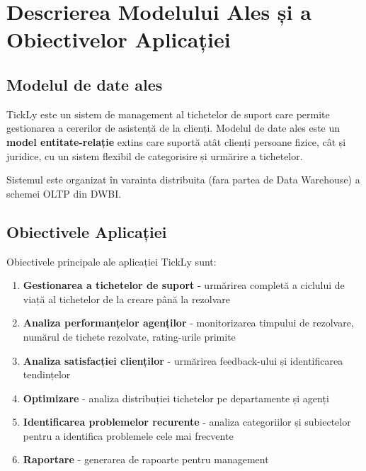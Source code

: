 \chapter{Descrierea Modelului Ales și a Obiectivelor Aplicației}
\label{sec:descriere}

\section{Modelul de date ales}

TickLy este un sistem de management al tichetelor de suport care permite gestionarea a cererilor de asistență de la clienți. Modelul de date ales este un \textbf{model entitate-relație} extins care suportă atât clienți persoane fizice, cât și juridice, cu un sistem flexibil de categorisire și urmărire a tichetelor.

Sistemul este organizat în varainta distribuita (fara partea de Data Warehouse) a schemei OLTP din DWBI.

\section{Obiectivele Aplicației}

Obiectivele principale ale aplicației TickLy sunt:

\begin{enumerate}
    \item \textbf{Gestionarea a tichetelor de suport} - urmărirea completă a ciclului de viață al tichetelor de la creare până la rezolvare
    \item \textbf{Analiza performanțelor agenților} - monitorizarea timpului de rezolvare, numărul de tichete rezolvate, rating-urile primite
    \item \textbf{Analiza satisfacției clienților} - urmărirea feedback-ului și identificarea tendințelor
    \item \textbf{Optimizare} - analiza distribuției tichetelor pe departamente și agenți
    \item \textbf{Identificarea problemelor recurente} - analiza categoriilor și subiectelor pentru a identifica problemele cele mai frecvente
    \item \textbf{Raportare} - generarea de rapoarte pentru management
\end{enumerate}

